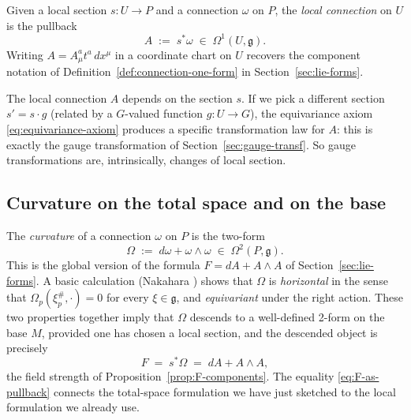 \begin{definition}\label{def:local-connection}
Given a local section $s : U \to P$ and a connection $\omega$ on $P$, the \emph{local connection} on $U$ is the pullback
\begin{equation}\label{eq:local-connection-def}
A \;:=\; s^* \omega \;\in\; \Omega^1(U, \mathfrak{g}).
\end{equation}
Writing $A = A_\mu^a t^a\, dx^\mu$ in a coordinate chart on $U$ recovers the component notation of Definition~\ref{def:connection-one-form} in Section~\ref{sec:lie-forms}.
\end{definition}

\noindent The local connection $A$ depends on the section $s$. If we pick a different section $s' = s \cdot g$ (related by a $G$-valued function $g : U \to G$), the equivariance axiom \eqref{eq:equivariance-axiom} produces a specific transformation law for $A$: this is exactly the gauge transformation of Section~\ref{sec:gauge-transf}. So gauge transformations are, intrinsically, changes of local section.

\subsection{Curvature on the total space and on the base}\label{sec:curvature-on-P}

The \emph{curvature} of a connection $\omega$ on $P$ is the two-form
\begin{equation}\label{eq:total-space-curvature}
\Omega \;:=\; d\omega + \omega \wedge \omega \;\in\; \Omega^2(P, \mathfrak{g}).
\end{equation}
This is the global version of the formula $F = dA + A \wedge A$ of Section~\ref{sec:lie-forms}. A basic calculation (Nakahara \cite{Nakahara2003GTP}) shows that $\Omega$ is \emph{horizontal} in the sense that $\Omega_p(\xi^\#_p, \cdot) = 0$ for every $\xi \in \mathfrak{g}$, and \emph{equivariant} under the right action. These two properties together imply that $\Omega$ descends to a well-defined 2-form on the base $M$, provided one has chosen a local section, and the descended object is precisely
\begin{equation}\label{eq:F-as-pullback}
F \;=\; s^* \Omega \;=\; dA + A \wedge A,
\end{equation}
the field strength of Proposition~\ref{prop:F-components}. The equality \eqref{eq:F-as-pullback} connects the total-space formulation we have just sketched to the local formulation we already use.


